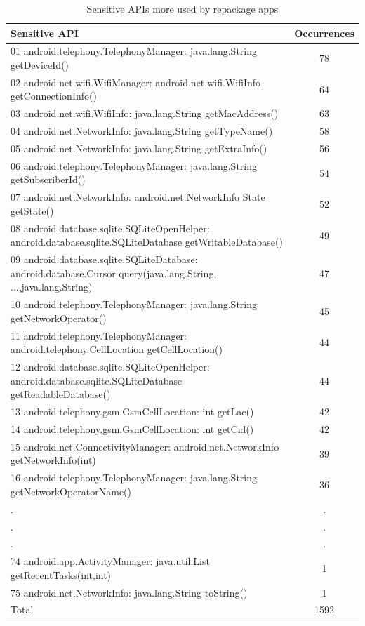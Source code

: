 \begin{table}[t]
 \scriptsize
  \caption{Sensitive APIs more used by repackage apps}
  \centering
 \begin{tabular}{lc}

   \toprule
   Sensitive API & Occurrences \\
   \midrule
   01 android.telephony.TelephonyManager: java.lang.String getDeviceId() &  78 \\
   02 android.net.wifi.WifiManager: android.net.wifi.WifiInfo getConnectionInfo() &  64\\
   03 android.net.wifi.WifiInfo: java.lang.String getMacAddress() &  63 \\
   04 android.net.NetworkInfo: java.lang.String getTypeName() &  58 \\
   05 android.net.NetworkInfo: java.lang.String getExtraInfo() &  56 \\
   06 android.telephony.TelephonyManager: java.lang.String getSubscriberId() &  54 \\
   07 android.net.NetworkInfo: android.net.NetworkInfo State getState() &  52 \\
   08 android.database.sqlite.SQLiteOpenHelper: android.database.sqlite.SQLiteDatabase getWritableDatabase() &  49 \\
   09 android.database.sqlite.SQLiteDatabase: android.database.Cursor query(java.lang.String, ...,java.lang.String) &  47 \\
   10 android.telephony.TelephonyManager: java.lang.String getNetworkOperator() &  45\\
   11 android.telephony.TelephonyManager: android.telephony.CellLocation getCellLocation() &  44\\
   12 android.database.sqlite.SQLiteOpenHelper: android.database.sqlite.SQLiteDatabase getReadableDatabase() &  44\\
   13 android.telephony.gsm.GsmCellLocation: int getLac() &  42 \\
   14 android.telephony.gsm.GsmCellLocation: int getCid() &  42 \\
   
   15 android.net.ConnectivityManager: android.net.NetworkInfo getNetworkInfo(int) &  39 \\
   16 android.telephony.TelephonyManager: java.lang.String getNetworkOperatorName() &  36 \\
   .&  .\\
   .&  .\\
   .&  .\\
   74 android.app.ActivityManager: java.util.List getRecentTasks(int,int) & 1 \\
   75 android.net.NetworkInfo: java.lang.String toString() & 1 \\

 \bottomrule
                            Total & 1592 \\

 \end{tabular}
 \label{tab:APIused}
\end{table}
